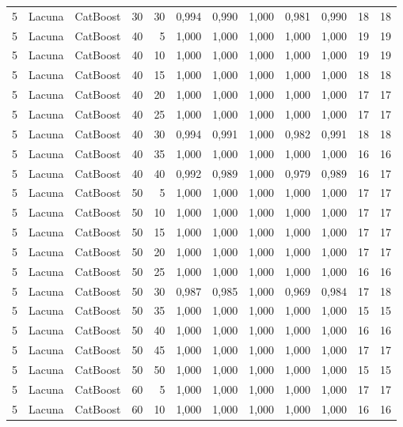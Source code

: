 \begin{longtable}{@{}rllrrrrrrrrr@{}}
5 & Lacuna & CatBoost & 30 & 30 & 0,994 & 0,990 & 1,000 & 0,981 & 0,990 & 18 & 18 \\
5 & Lacuna & CatBoost & 40 & 5 & 1,000 & 1,000 & 1,000 & 1,000 & 1,000 & 19 & 19 \\
5 & Lacuna & CatBoost & 40 & 10 & 1,000 & 1,000 & 1,000 & 1,000 & 1,000 & 19 & 19 \\
5 & Lacuna & CatBoost & 40 & 15 & 1,000 & 1,000 & 1,000 & 1,000 & 1,000 & 18 & 18 \\
5 & Lacuna & CatBoost & 40 & 20 & 1,000 & 1,000 & 1,000 & 1,000 & 1,000 & 17 & 17 \\
5 & Lacuna & CatBoost & 40 & 25 & 1,000 & 1,000 & 1,000 & 1,000 & 1,000 & 17 & 17 \\
5 & Lacuna & CatBoost & 40 & 30 & 0,994 & 0,991 & 1,000 & 0,982 & 0,991 & 18 & 18 \\
5 & Lacuna & CatBoost & 40 & 35 & 1,000 & 1,000 & 1,000 & 1,000 & 1,000 & 16 & 16 \\
5 & Lacuna & CatBoost & 40 & 40 & 0,992 & 0,989 & 1,000 & 0,979 & 0,989 & 16 & 17 \\
5 & Lacuna & CatBoost & 50 & 5 & 1,000 & 1,000 & 1,000 & 1,000 & 1,000 & 17 & 17 \\
5 & Lacuna & CatBoost & 50 & 10 & 1,000 & 1,000 & 1,000 & 1,000 & 1,000 & 17 & 17 \\
5 & Lacuna & CatBoost & 50 & 15 & 1,000 & 1,000 & 1,000 & 1,000 & 1,000 & 17 & 17 \\
5 & Lacuna & CatBoost & 50 & 20 & 1,000 & 1,000 & 1,000 & 1,000 & 1,000 & 17 & 17 \\
5 & Lacuna & CatBoost & 50 & 25 & 1,000 & 1,000 & 1,000 & 1,000 & 1,000 & 16 & 16 \\
5 & Lacuna & CatBoost & 50 & 30 & 0,987 & 0,985 & 1,000 & 0,969 & 0,984 & 17 & 18 \\
5 & Lacuna & CatBoost & 50 & 35 & 1,000 & 1,000 & 1,000 & 1,000 & 1,000 & 15 & 15 \\
5 & Lacuna & CatBoost & 50 & 40 & 1,000 & 1,000 & 1,000 & 1,000 & 1,000 & 16 & 16 \\
5 & Lacuna & CatBoost & 50 & 45 & 1,000 & 1,000 & 1,000 & 1,000 & 1,000 & 17 & 17 \\
5 & Lacuna & CatBoost & 50 & 50 & 1,000 & 1,000 & 1,000 & 1,000 & 1,000 & 15 & 15 \\
5 & Lacuna & CatBoost & 60 & 5 & 1,000 & 1,000 & 1,000 & 1,000 & 1,000 & 17 & 17 \\
5 & Lacuna & CatBoost & 60 & 10 & 1,000 & 1,000 & 1,000 & 1,000 & 1,000 & 16 & 16 \\

\end{longtable}
